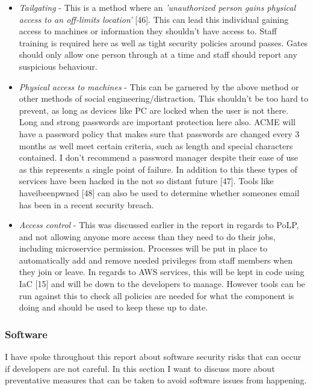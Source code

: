   \begin{itemize}
    \item \textit{Tailgating} - This is a method where an \textit{'unauthorized person gains physical access to an off-limits location'} [46]. This can 
    lead this individual gaining access to machines or information they shouldn't have access to. Staff training is required here as well as tight security
    policies around passes. Gates should only allow one person through at a time and staff should report any suspicious behaviour.

    \item \textit{Physical access to machines} - This can be garnered by the above method or other methods of social engineering/distraction. This shouldn't
    be too hard to prevent, as long as devices like PC are locked when the user is not there. Long and strong passwords are important protection here also.
    ACME will have a password policy that makes sure that passwords are changed every 3 months as well meet certain criteria, such as length and special
    characters contained. I don't recommend a password manager despite their ease of use as this represents a single point of failure. In addition to this
    these types of services have been hacked in the not so distant future [47]. Tools like haveibeenpwned [48] can also be used to determine whether someones
    email has been in a recent security breach.

    \item \textit{Access control} - This was discussed earlier in the report in regards to PoLP, and not allowing anyone more access than they need to do 
    their jobs, including microservice permission. Processes will be put in place to automatically add and remove needed privileges from staff members when 
    they join or leave. In regards to AWS services, this will be kept in code using IaC [15] and will be down to the developers to manage. However tools can
    be run against this to check all policies are needed for what the component is doing and should be used to keep these up to date.
    
  \end{itemize}

  \subsubsection{Software}
  I have spoke throughout this report about software security risks that can occur if developers are not careful. In this section I want to discuss
  more about preventative measures that can be taken to avoid software issues from happening.

